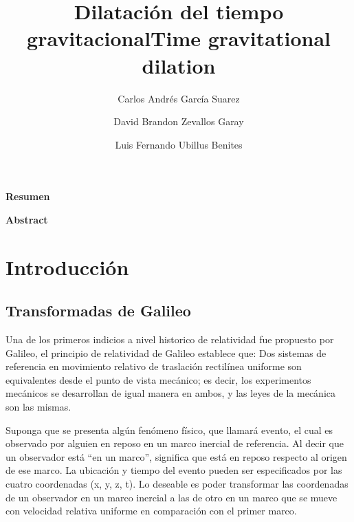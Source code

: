\documentclass[12pt,twoside]{rif}
\title{\textbf{Dilatación del tiempo gravitacional}}
\author[1]{{\small Carlos Andrés García Suarez}}
\author[1]{{\small David Brandon Zevallos Garay}}
\author[1]{{\small Luis Fernando Ubillus Benites}}
\affil[1]{{ \small Facultad de Ciencias Naturales y Matemática, Universidad
		Nacional Federico Villarreal. El Agustino 15003. Lima-Perú.}}
\date{}
\begin{document}
	\maketitle
	
	\begin{res}
		\begin{center}
			\textbf{Resumen} \\
		\end{center}
		\lipsum[2]
		
		\par
		\smallskip
	\end{res}
	\begin{center}
		\title{\textbf{Time gravitational dilation}}
	\end{center}
	
	\begin{abst}
		\begin{center}
			\textbf{Abstract} \\
		\end{center}
		\lipsum[2]
		
		\par 
		\smallskip
	\end{abst}

	
	
	\newpage
	
	\tableofcontents
	
	\section{ Introducción} 
	\subsection{Transformadas de Galileo}
	Una de los primeros indicios a nivel historico de relatividad fue propuesto 
	por Galileo, el principio de relatividad de Galileo establece que:
	Dos sistemas de referencia en movimiento relativo de traslación rectilínea 
	uniforme son equivalentes desde el punto de vista mecánico; es decir, los experimentos 
	mecánicos se desarrollan de igual manera en ambos, y las leyes de la mecánica son las mismas.

    Suponga que se presenta algún fenómeno físico, que llamará evento, el cual es observado por alguien en reposo en un marco inercial de referencia. Al decir que un observador está “en un marco”, significa que está en reposo respecto al origen de ese marco. La
    ubicación y tiempo del evento pueden ser especificados por las cuatro coordenadas (x, y,
    z, t). Lo deseable es poder transformar las coordenadas de un observador en un marco
    inercial a las de otro en un marco que se mueve con velocidad relativa uniforme en comparación con el primer marco.
\end{document}

